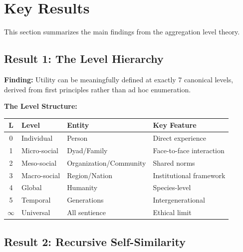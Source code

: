 

\section{Key Results}
\label{sec:AAA-key-results}

This section summarizes the main findings from the aggregation level theory.

\subsection{Result 1: The Level Hierarchy}

\begin{tcolorbox}[colback=green!5!white, colframe=green!75!black]
\textbf{Finding:} Utility can be meaningfully defined at exactly 7 canonical levels, 
derived from first principles rather than ad hoc enumeration.

\textbf{The Level Structure:}
\begin{center}
\begin{tabular}{@{}clll@{}}
\toprule
\textbf{L} & \textbf{Level} & \textbf{Entity} & \textbf{Key Feature} \\
\midrule
0 & Individual & Person & Direct experience \\
1 & Micro-social & Dyad/Family & Face-to-face interaction \\
2 & Meso-social & Organization/Community & Shared norms \\
3 & Macro-social & Region/Nation & Institutional framework \\
4 & Global & Humanity & Species-level \\
5 & Temporal & Generations & Intergenerational \\
$\infty$ & Universal & All sentience & Ethical limit \\
\bottomrule
\end{tabular}
\end{center}
\end{tcolorbox}

\subsection{Result 2: Recursive Self-Similarity}

